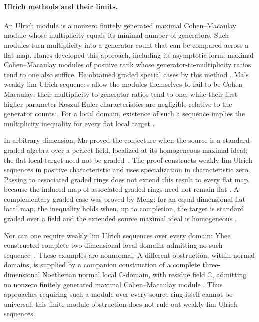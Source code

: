 \documentclass[11pt]{article}
\numberwithin{equation}{section}
\theoremstyle{definition}
\begin{document}
\paragraph{Ulrich methods and their limits.}
An Ulrich module is a nonzero finitely generated maximal
Cohen--Macaulay module whose multiplicity equals its minimal number
of generators. Such modules turn multiplicity into a generator count
that can be compared across a flat map. Hanes developed this approach,
including its asymptotic form: maximal Cohen--Macaulay modules of
positive rank whose generator-to-multiplicity ratios tend to one
also suffice. He obtained graded special cases by this method
\cite[Chapter~IV, especially Proposition~4.1.5]{Hanes}.
Ma's weakly lim Ulrich sequences allow the modules themselves to
fail to be Cohen--Macaulay: their multiplicity-to-generator ratios
tend to one, while their first higher parameter Koszul Euler
characteristics are negligible relative to the generator counts
\cite[Definitions~2.2 and~2.9]{MaUlrich}.
For a local domain, existence of such a sequence implies the
multiplicity inequality for every flat local target
\cite[Theorem~2.11]{MaUlrich}.

In arbitrary dimension, Ma proved the conjecture when the source
is a standard graded algebra over a perfect field, localized at
its homogeneous maximal ideal; the flat local target need not be
graded~\cite[Theorem~3.8]{MaUlrich}. The proof constructs weakly lim
Ulrich sequences in positive characteristic and uses specialization
in characteristic zero. Passing to associated graded rings does
not extend this result to every flat map, because the induced map
of associated graded rings need not remain flat
\cite[Remark~3.9]{MaUlrich}.
A complementary graded case was proved by Meng: for an
equal-dimensional flat local map, the inequality holds when, up to
completion, the target is standard graded over a field and the
extended source maximal ideal is homogeneous
\cite[Theorem~5.13]{Meng}.

Nor can one require weakly lim Ulrich sequences over every domain:
Yhee constructed complete two-dimensional local domains admitting
no such sequence~\cite[Theorem~6.2]{Yhee}. These examples are
nonnormal. A different obstruction, within normal domains, is supplied
by a companion construction of a complete three-dimensional Noetherian
normal local $\mathbb C$-domain, with residue field $\mathbb C$, admitting
no nonzero finitely generated maximal Cohen--Macaulay module
\cite[Theorem~1.1]{SmallCM}. Thus approaches requiring such a module
over every source ring itself cannot be universal; this finite-module
obstruction does not rule out weakly lim Ulrich sequences.
\end{document}
